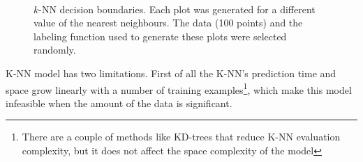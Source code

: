 \begin{figure}[!h]
   \centering
   \quad
   \\
   \quad
   \caption{$k$-NN decision boundaries. Each plot was generated for a different value of the nearest neighbours. The data (100 points) and the labeling function used to generate these plots were selected randomly.
   \label{fig:knn decision boundary}}
\end{figure}

K-NN model has two limitations. First of all the K-NN's prediction time and space grow linearly with a number of training examples\footnote{There are a couple of methods like KD-trees that reduce K-NN evaluation complexity, but it does not affect the space complexity of the model}, which make this model infeasible when the amount of the data is significant.
  
